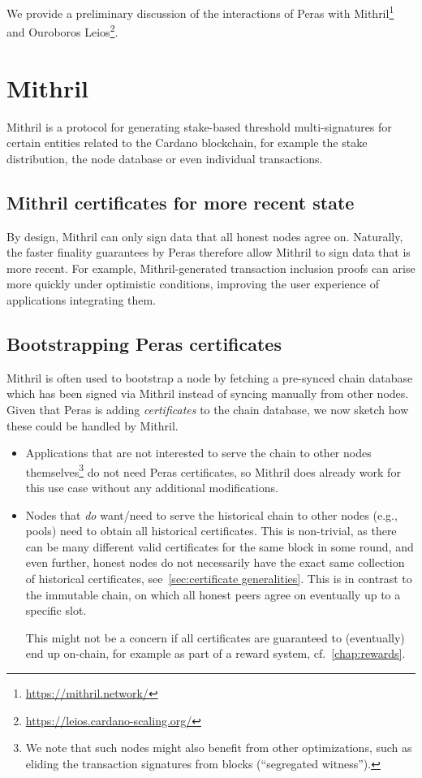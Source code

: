 We provide a preliminary discussion of the interactions of Peras with Mithril\footnote{\label{footnote:mithril}\url{https://mithril.network/}} and Ouroboros Leios\footnote{\label{footnote:leios}\url{https://leios.cardano-scaling.org/}}.

\section{Mithril}\label{sec:mithril}

Mithril is a protocol for generating stake-based threshold multi-signatures for certain entities related to the Cardano blockchain, for example the stake distribution, the node database or even individual transactions.

\subsection{Mithril certificates for more recent state}

By design, Mithril can only sign data that all honest nodes agree on.
Naturally, the faster finality guarantees by Peras therefore allow Mithril to sign data that is more recent.
For example, Mithril-generated transaction inclusion proofs can arise more quickly under optimistic conditions, improving the user experience of applications integrating them.

\subsection{Bootstrapping Peras certificates}
Mithril is often used to bootstrap a node by fetching a pre-synced chain database which has been signed via Mithril instead of syncing manually from other nodes.
Given that Peras is adding \emph{certificates} to the chain database, we now sketch how these could be handled by Mithril.
\begin{itemize}
\item
  Applications that are not interested to serve the chain to other nodes themselves\footnote{
    We note that such nodes might also benefit from other optimizations, such as eliding the transaction signatures from blocks (\enquote{segregated witness}).}
  do not need Peras certificates, so Mithril does already work for this use case without any additional modifications.
\item
  Nodes that \emph{do} want/need to serve the historical chain to other nodes (e.g., pools) need to obtain all historical certificates.
  This is non-trivial, as there can be many different valid certificates for the same block in some round, and even further, honest nodes do not necessarily have the exact same collection of historical certificates, see~\cref{sec:certificate generalities}.
  This is in contrast to the immutable chain, on which all honest peers agree on eventually up to a specific slot.

  This might not be a concern if all certificates are guaranteed to (eventually) end up on-chain, for example as part of a reward system, cf.\ \cref{chap:rewards}.
\end{itemize}

